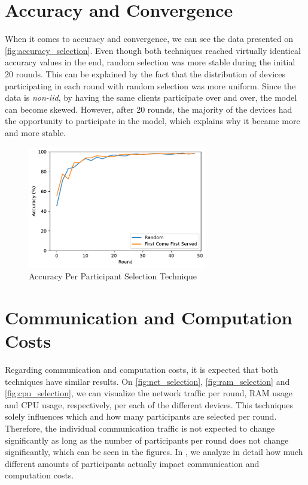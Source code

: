 \section{Accuracy and Convergence}

When it comes to accuracy and convergence, we can see the data presented on \autoref{fig:accuracy_selection}. Even though both techniques reached virtually identical accuracy values in the end, random selection was more stable during the initial 20 rounds. This can be explained by the fact that the distribution of devices participating in each round with random selection was more uniform. Since the data is \textit{non-iid}, by having the same clients participate over and over, the model can become skewed. However, after 20 rounds, the majority of the devices had the opportunity to participate in the model, which explains why it became more and more stable.

\begin{figure}[!ht]
    \centering
    \centering
    \includegraphics[width=0.7\textwidth]{graphics/selection/accuracy.pdf}
    \caption{Accuracy Per Participant Selection Technique}
    \label{fig:accuracy_selection}
\end{figure}

\section{Communication and Computation Costs}

Regarding communication and computation costs, it is expected that both techniques have similar results. On \autoref{fig:net_selection}, \autoref{fig:ram_selection} and \autoref{fig:cpu_selection}, we can visualize the network traffic per round, RAM usage and CPU usage, respectively, per each of the different devices. This techniques solely influences which and how many participants are selected per round. Therefore, the individual communication traffic is not expected to change significantly as long as the number of participants per round does not change significantly, which can be seen in the figures. In , we analyze in detail how much different amounts of participants actually impact communication and computation costs.

